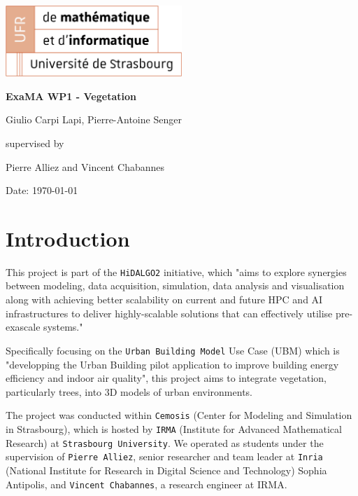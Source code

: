 \documentclass[12pt]{article}
\begin{document}
\begin{titlepage}
\centering
\includegraphics[width=0.5\textwidth]{images/logo-ufr.png}\par\vspace{1cm}
\vspace{1.5cm}
{\huge\bfseries ExaMA WP1 - Vegetation\par}
\vspace{2cm}
{\Large Giulio Carpi Lapi, Pierre-Antoine Senger\par}
\vfill
supervised by\par
Pierre Alliez and Vincent Chabannes

\vfill

{\large Date: \today\par}
\end{titlepage}

\tableofcontents

\newpage

\section{Introduction}

This project is part of the \texttt{HiDALGO2}\cite{hidalgo2} initiative, which
"aims to explore synergies between modeling, data acquisition, simulation,
data analysis and visualisation along with achieving better scalability on
current and future HPC and AI infrastructures to deliver highly-scalable
solutions that can effectively utilise pre-exascale systems."\cite{hidalgo2-about}

Specifically focusing on the \texttt{Urban Building Model}\cite{hidalgo2-ubm}
Use Case (UBM) which is "developping the Urban Building pilot application to
improve building energy efficiency and indoor air quality"\cite{hidalgo2-ubm},
this project aims to integrate vegetation, particularly trees, into 3D models
of urban environments.

The project was conducted within \texttt{Cemosis}\cite{cemosis} (Center for
Modeling and Simulation in Strasbourg), which is hosted by
\texttt{IRMA}\cite{irma} (Institute for Advanced Mathematical Research) at
\texttt{Strasbourg University}. We operated as students under the supervision of
\texttt{Pierre Alliez}\cite{alliez}, senior researcher and team leader at
\texttt{Inria}\cite{Inria} (National Institute for Research in Digital Science
and Technology) Sophia Antipolis, and \texttt{Vincent Chabannes}\cite{chabannes},
a research engineer at IRMA.
\end{document}
